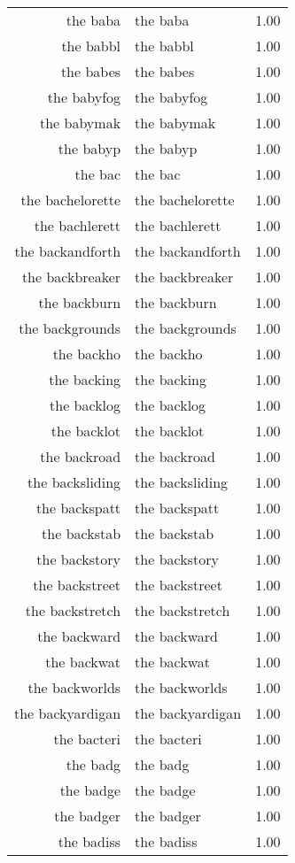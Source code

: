 \begin{table}[ht]
\begin{tabular}{rlr}
  the baba & the baba & 1.00 \\ 
  the babbl & the babbl & 1.00 \\ 
  the babes & the babes & 1.00 \\ 
  the babyfog & the babyfog & 1.00 \\ 
  the babymak & the babymak & 1.00 \\ 
  the babyp & the babyp & 1.00 \\ 
  the bac & the bac & 1.00 \\ 
  the bachelorette & the bachelorette & 1.00 \\ 
  the bachlerett & the bachlerett & 1.00 \\ 
  the backandforth & the backandforth & 1.00 \\ 
  the backbreaker & the backbreaker & 1.00 \\ 
  the backburn & the backburn & 1.00 \\ 
  the backgrounds & the backgrounds & 1.00 \\ 
  the backho & the backho & 1.00 \\ 
  the backing & the backing & 1.00 \\ 
  the backlog & the backlog & 1.00 \\ 
  the backlot & the backlot & 1.00 \\ 
  the backroad & the backroad & 1.00 \\ 
  the backsliding & the backsliding & 1.00 \\ 
  the backspatt & the backspatt & 1.00 \\ 
  the backstab & the backstab & 1.00 \\ 
  the backstory & the backstory & 1.00 \\ 
  the backstreet & the backstreet & 1.00 \\ 
  the backstretch & the backstretch & 1.00 \\ 
  the backward & the backward & 1.00 \\ 
  the backwat & the backwat & 1.00 \\ 
  the backworlds & the backworlds & 1.00 \\ 
  the backyardigan & the backyardigan & 1.00 \\ 
  the bacteri & the bacteri & 1.00 \\ 
  the badg & the badg & 1.00 \\ 
  the badge & the badge & 1.00 \\ 
  the badger & the badger & 1.00 \\ 
  the badiss & the badiss & 1.00 \\ 

\end{tabular}
\end{table}
